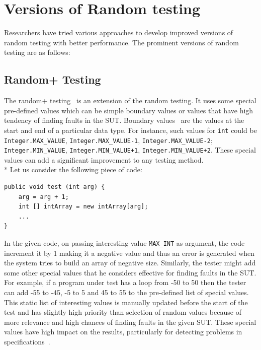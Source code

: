 \section{Versions of Random testing}
Researchers have tried various approaches to develop improved versions of random testing with better performance. The prominent versions of random testing are as follows:

\subsection{Random+ Testing}
The random+ testing~\cite{leitner2007reconciling} is an extension of the random testing. It uses some special pre-defined values which can be simple boundary values or values that have high tendency of finding faults in the SUT. Boundary values~\cite{beizer2003software} are the values at the start and end of a particular data type. For instance, such values for \verb+int+ could be \verb+Integer.MAX_VALUE+, \verb+Integer.MAX_VALUE-1+, \verb+Integer.MAX_VALUE-2+; \verb+Integer.MIN_VALUE+, \verb-Integer.MIN_VALUE+1-, \verb-Integer.MIN_VALUE+2-. These special values can add a significant improvement to any testing method. \\*
Let us consider the following piece of code:

\begin{lstlisting}
public void test (int arg) {
	arg = arg + 1;
	int [] intArray = new intArray[arg];
	...
}
\end{lstlisting}

In the given code, on passing interesting value \verb+MAX_INT+ as argument, the code increment it by 1 making it a negative value and thus an error is generated when the system tries to build an array of negative size. Similarly, the tester might add some other special values that he considers effective for finding faults in the SUT. For example, if a program under test has a loop from -50 to 50 then the tester can add -55 to -45, -5 to 5 and 45 to 55 to the pre-defined list of special values. This static list of interesting values is manually updated before the start of the test and has slightly high priority than selection of random values because of more relevance and high chances of finding faults in the given SUT. These special values have high impact on the results, particularly for detecting problems in specifications~\cite{ciupa2008finding}.


